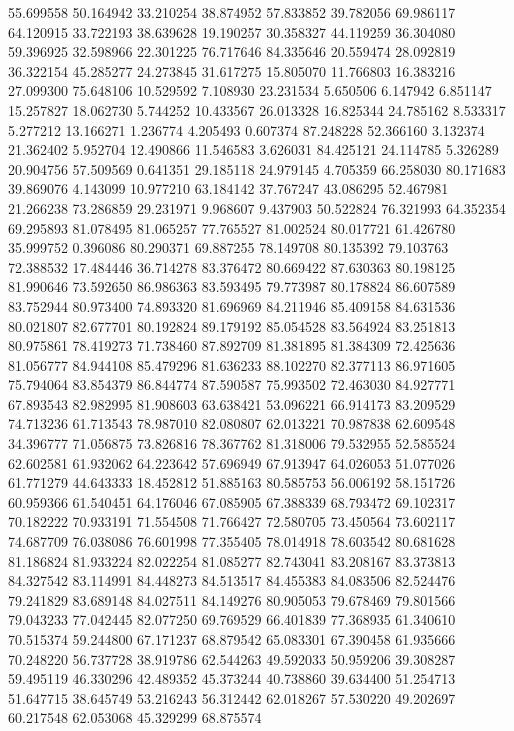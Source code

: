 55.699558
50.164942
33.210254
38.874952
57.833852
39.782056
69.986117
64.120915
33.722193
38.639628
19.190257
30.358327
44.119259
36.304080
59.396925
32.598966
22.301225
76.717646
84.335646
20.559474
28.092819
36.322154
45.285277
24.273845
31.617275
15.805070
11.766803
16.383216
27.099300
75.648106
10.529592
7.108930
23.231534
5.650506
6.147942
6.851147
15.257827
18.062730
5.744252
10.433567
26.013328
16.825344
24.785162
8.533317
5.277212
13.166271
1.236774
4.205493
0.607374
87.248228
52.366160
3.132374
21.362402
5.952704
12.490866
11.546583
3.626031
84.425121
24.114785
5.326289
20.904756
57.509569
0.641351
29.185118
24.979145
4.705359
66.258030
80.171683
39.869076
4.143099
10.977210
63.184142
37.767247
43.086295
52.467981
21.266238
73.286859
29.231971
9.968607
9.437903
50.522824
76.321993
64.352354
69.295893
81.078495
81.065257
77.765527
81.002524
80.017721
61.426780
35.999752
0.396086
80.290371
69.887255
78.149708
80.135392
79.103763
72.388532
17.484446
36.714278
83.376472
80.669422
87.630363
80.198125
81.990646
73.592650
86.986363
83.593495
79.773987
80.178824
86.607589
83.752944
80.973400
74.893320
81.696969
84.211946
85.409158
84.631536
80.021807
82.677701
80.192824
89.179192
85.054528
83.564924
83.251813
80.975861
78.419273
71.738460
87.892709
81.381895
81.384309
72.425636
81.056777
84.944108
85.479296
81.636233
88.102270
82.377113
86.971605
75.794064
83.854379
86.844774
87.590587
75.993502
72.463030
84.927771
67.893543
82.982995
81.908603
63.638421
53.096221
66.914173
83.209529
74.713236
61.713543
78.987010
82.080807
62.013221
70.987838
62.609548
34.396777
71.056875
73.826816
78.367762
81.318006
79.532955
52.585524
62.602581
61.932062
64.223642
57.696949
67.913947
64.026053
51.077026
61.771279
44.643333
18.452812
51.885163
80.585753
56.006192
58.151726
60.959366
61.540451
64.176046
67.085905
67.388339
68.793472
69.102317
70.182222
70.933191
71.554508
71.766427
72.580705
73.450564
73.602117
74.687709
76.038086
76.601998
77.355405
78.014918
78.603542
80.681628
81.186824
81.933224
82.022254
81.085277
82.743041
83.208167
83.373813
84.327542
83.114991
84.448273
84.513517
84.455383
84.083506
82.524476
79.241829
83.689148
84.027511
84.149276
80.905053
79.678469
79.801566
79.043233
77.042445
82.077250
69.769529
66.401839
77.368935
61.340610
70.515374
59.244800
67.171237
68.879542
65.083301
67.390458
61.935666
70.248220
56.737728
38.919786
62.544263
49.592033
50.959206
39.308287
59.495119
46.330296
42.489352
45.373244
40.738860
39.634400
51.254713
51.647715
38.645749
53.216243
56.312442
62.018267
57.530220
49.202697
60.217548
62.053068
45.329299
68.875574
